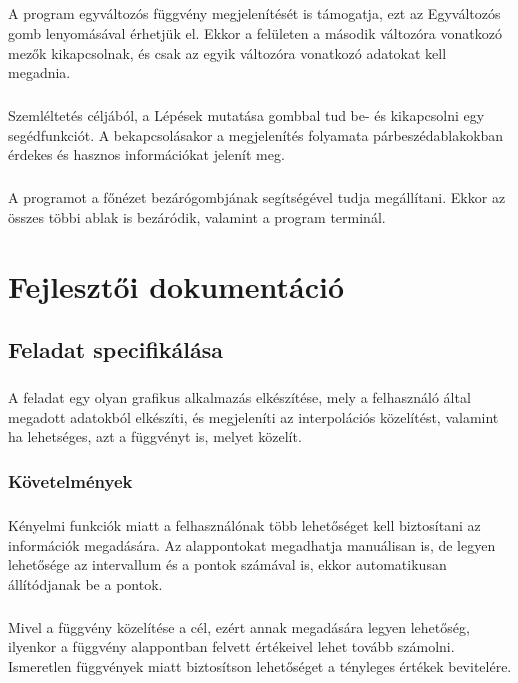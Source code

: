 \documentclass[12pt]{report}
\begin{document}
\paragraph{}
A program egyváltozós függvény megjelenítését is támogatja, ezt az Egyváltozós gomb lenyomásával érhetjük el. Ekkor a felületen a második változóra vonatkozó mezők kikapcsolnak, és csak az egyik változóra vonatkozó adatokat kell megadnia.
\paragraph{}
Szemléltetés céljából, a Lépések mutatása gombbal tud be- és kikapcsolni egy segédfunkciót. A bekapcsolásakor a megjelenítés folyamata párbeszédablakokban érdekes és hasznos információkat jelenít meg.
\paragraph{}
A programot a főnézet bezárógombjának segítségével tudja megállítani. Ekkor az összes többi ablak is bezáródik, valamint a program terminál.
\chapter{Fejlesztői dokumentáció}
\section{Feladat specifikálása}
\paragraph{}
A feladat egy olyan grafikus alkalmazás elkészítése, mely a felhasználó által megadott adatokból elkészíti, és megjeleníti az interpolációs közelítést, valamint ha lehetséges, azt a függvényt is, melyet közelít.
\subsection{Követelmények}
\paragraph{}
Kényelmi funkciók miatt a felhasználónak több lehetőséget kell biztosítani az információk megadására. Az alappontokat megadhatja manuálisan is, de legyen lehetősége az intervallum és a pontok számával is, ekkor automatikusan állítódjanak be a pontok.
\paragraph{}
Mivel a függvény közelítése a cél, ezért annak megadására legyen lehetőség, ilyenkor a függvény alappontban felvett értékeivel lehet tovább számolni. Ismeretlen függvények miatt biztosítson lehetőséget a tényleges értékek bevitelére.
\end{document}
